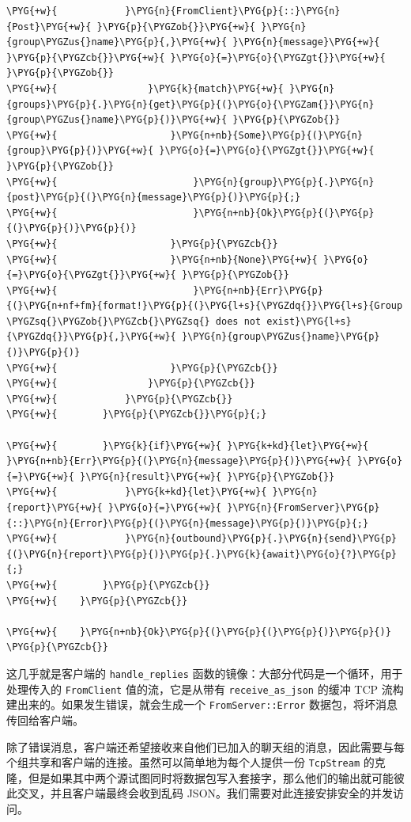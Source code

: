 \begin{Verbatim}[commandchars=\\\{\},breaklines=true,breakanywhere=true,fontsize=\codefont,xleftmargin=17bp]
\PYG{+w}{            }\PYG{n}{FromClient}\PYG{p}{::}\PYG{n}{Post}\PYG{+w}{ }\PYG{p}{\PYGZob{}}\PYG{+w}{ }\PYG{n}{group\PYGZus{}name}\PYG{p}{,}\PYG{+w}{ }\PYG{n}{message}\PYG{+w}{ }\PYG{p}{\PYGZcb{}}\PYG{+w}{ }\PYG{o}{=}\PYG{o}{\PYGZgt{}}\PYG{+w}{ }\PYG{p}{\PYGZob{}}
\PYG{+w}{                }\PYG{k}{match}\PYG{+w}{ }\PYG{n}{groups}\PYG{p}{.}\PYG{n}{get}\PYG{p}{(}\PYG{o}{\PYGZam{}}\PYG{n}{group\PYGZus{}name}\PYG{p}{)}\PYG{+w}{ }\PYG{p}{\PYGZob{}}
\PYG{+w}{                    }\PYG{n+nb}{Some}\PYG{p}{(}\PYG{n}{group}\PYG{p}{)}\PYG{+w}{ }\PYG{o}{=}\PYG{o}{\PYGZgt{}}\PYG{+w}{ }\PYG{p}{\PYGZob{}}
\PYG{+w}{                        }\PYG{n}{group}\PYG{p}{.}\PYG{n}{post}\PYG{p}{(}\PYG{n}{message}\PYG{p}{)}\PYG{p}{;}
\PYG{+w}{                        }\PYG{n+nb}{Ok}\PYG{p}{(}\PYG{p}{(}\PYG{p}{)}\PYG{p}{)}
\PYG{+w}{                    }\PYG{p}{\PYGZcb{}}
\PYG{+w}{                    }\PYG{n+nb}{None}\PYG{+w}{ }\PYG{o}{=}\PYG{o}{\PYGZgt{}}\PYG{+w}{ }\PYG{p}{\PYGZob{}}
\PYG{+w}{                        }\PYG{n+nb}{Err}\PYG{p}{(}\PYG{n+nf+fm}{format!}\PYG{p}{(}\PYG{l+s}{\PYGZdq{}}\PYG{l+s}{Group \PYGZsq{}\PYGZob{}\PYGZcb{}\PYGZsq{} does not exist}\PYG{l+s}{\PYGZdq{}}\PYG{p}{,}\PYG{+w}{ }\PYG{n}{group\PYGZus{}name}\PYG{p}{)}\PYG{p}{)}
\PYG{+w}{                    }\PYG{p}{\PYGZcb{}}
\PYG{+w}{                }\PYG{p}{\PYGZcb{}}
\PYG{+w}{            }\PYG{p}{\PYGZcb{}}
\PYG{+w}{        }\PYG{p}{\PYGZcb{}}\PYG{p}{;}

\PYG{+w}{        }\PYG{k}{if}\PYG{+w}{ }\PYG{k+kd}{let}\PYG{+w}{ }\PYG{n+nb}{Err}\PYG{p}{(}\PYG{n}{message}\PYG{p}{)}\PYG{+w}{ }\PYG{o}{=}\PYG{+w}{ }\PYG{n}{result}\PYG{+w}{ }\PYG{p}{\PYGZob{}}
\PYG{+w}{            }\PYG{k+kd}{let}\PYG{+w}{ }\PYG{n}{report}\PYG{+w}{ }\PYG{o}{=}\PYG{+w}{ }\PYG{n}{FromServer}\PYG{p}{::}\PYG{n}{Error}\PYG{p}{(}\PYG{n}{message}\PYG{p}{)}\PYG{p}{;}
\PYG{+w}{            }\PYG{n}{outbound}\PYG{p}{.}\PYG{n}{send}\PYG{p}{(}\PYG{n}{report}\PYG{p}{)}\PYG{p}{.}\PYG{k}{await}\PYG{o}{?}\PYG{p}{;}
\PYG{+w}{        }\PYG{p}{\PYGZcb{}}
\PYG{+w}{    }\PYG{p}{\PYGZcb{}}

\PYG{+w}{    }\PYG{n+nb}{Ok}\PYG{p}{(}\PYG{p}{(}\PYG{p}{)}\PYG{p}{)}
\PYG{p}{\PYGZcb{}}
\end{Verbatim}

这几乎就是客户端的 \texttt{handle\_replies} 函数的镜像：大部分代码是一个循环，用于处理传入的 \texttt{FromClient} 值的流，它是从带有 \texttt{receive\_as\_json} 的缓冲 TCP 流构建出来的。如果发生错误，就会生成一个 \texttt{FromServer::Error} 数据包，将坏消息传回给客户端。

除了错误消息，客户端还希望接收来自他们已加入的聊天组的消息，因此需要与每个组共享和客户端的连接。虽然可以简单地为每个人提供一份 \texttt{TcpStream} 的克隆，但是如果其中两个源试图同时将数据包写入套接字，那么他们的输出就可能彼此交叉，并且客户端最终会收到乱码 JSON。我们需要对此连接安排安全的并发访问。


